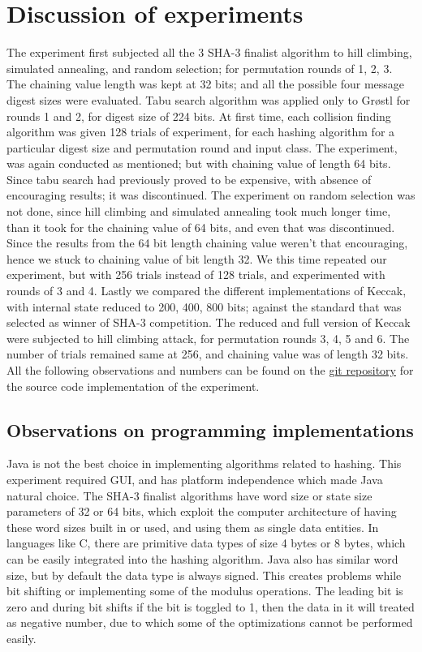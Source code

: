 \chapter{Discussion of experiments}

The experiment first subjected all the 3 SHA-3 finalist algorithm to hill climbing, simulated annealing, and
random selection; for permutation rounds of 1, 2, 3. The chaining value length was kept at 32 bits; and all
the possible four message digest sizes were evaluated. Tabu search algorithm was applied only to Gr{\o}stl
for rounds 1 and 2, for digest size of 224 bits. At first time, each collision finding algorithm was given
128 trials of experiment, for each hashing algorithm for a particular digest size and permutation round and
input class. The experiment, was again conducted as mentioned; but with chaining value of length 64 bits. Since
tabu search had previously proved to be expensive, with absence of encouraging results; it was discontinued.
The experiment on random selection was not done, since hill climbing and simulated annealing took much longer
time, than it took for the chaining value of 64 bits, and even that was discontinued. Since the results from
the 64 bit length chaining value weren't that encouraging, hence we stuck to chaining value of bit length 32.
We this time repeated our experiment, but with 256 trials instead of 128 trials, and experimented with rounds
of 3 and 4. Lastly we compared the different implementations of Keccak, with internal state reduced to 200,
400, 800 bits; against the standard that was selected as winner of SHA-3 competition. The reduced and full
version of Keccak were subjected to hill climbing attack, for permutation rounds 3, 4, 5 and 6. The number of
trials remained same at 256, and chaining value was of length 32 bits. 
All the following observations and numbers can be found on the 
\href{https://github.com/sxs9174/MSProjectCode/tree/master/MSProjectCode/Output}{git repository} for the source
code implementation of the experiment.

\section{Observations on programming implementations}

Java is not the best choice in implementing algorithms related to hashing. This experiment required GUI, and has
platform independence which made Java natural choice. The SHA-3 finalist algorithms have word size
or state size parameters of 32 or 64 bits, which exploit the computer architecture of having these word sizes
built in or used, and using them as single data entities. In languages like C, there are primitive data types
of size 4 bytes or 8 bytes, which can be easily integrated into the hashing algorithm. Java also has similar
word size, but by default the data type is always signed. This creates problems while bit shifting or implementing
some of the modulus operations. The leading bit is zero and during bit shifts if the bit is toggled to 1, then 
the data in it will treated as negative number, due to which some of the optimizations cannot be performed easily.


